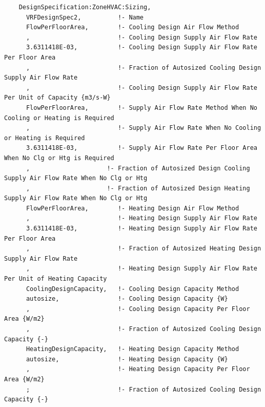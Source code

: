 \begin{lstlisting}
    DesignSpecification:ZoneHVAC:Sizing,
      VRFDesignSpec2,          !- Name
      FlowPerFloorArea,        !- Cooling Design Air Flow Method
      ,                        !- Cooling Design Supply Air Flow Rate
      3.6311418E-03,           !- Cooling Design Supply Air Flow Rate Per Floor Area
      ,                        !- Fraction of Autosized Cooling Design Supply Air Flow Rate
      ,                        !- Cooling Design Supply Air Flow Rate Per Unit of Capacity {m3/s-W}
      FlowPerFloorArea,        !- Supply Air Flow Rate Method When No Cooling or Heating is Required
      ,                        !- Supply Air Flow Rate When No Cooling or Heating is Required
      3.6311418E-03,           !- Supply Air Flow Rate Per Floor Area When No Clg or Htg is Required
      ,                     !- Fraction of Autosized Design Cooling Supply Air Flow Rate When No Clg or Htg
      ,                     !- Fraction of Autosized Design Heating Supply Air Flow Rate When No Clg or Htg
      FlowPerFloorArea,        !- Heating Design Air Flow Method
      ,                        !- Heating Design Supply Air Flow Rate
      3.6311418E-03,           !- Heating Design Supply Air Flow Rate Per Floor Area
      ,                        !- Fraction of Autosized Heating Design Supply Air Flow Rate
      ,                        !- Heating Design Supply Air Flow Rate Per Unit of Heating Capacity
      CoolingDesignCapacity,   !- Cooling Design Capacity Method
      autosize,                !- Cooling Design Capacity {W}
      ,                        !- Cooling Design Capacity Per Floor Area {W/m2}
      ,                        !- Fraction of Autosized Cooling Design Capacity {-}
      HeatingDesignCapacity,   !- Heating Design Capacity Method
      autosize,                !- Heating Design Capacity {W}
      ,                        !- Heating Design Capacity Per Floor Area {W/m2}
      ;                        !- Fraction of Autosized Cooling Design Capacity {-}


\end{lstlisting}

